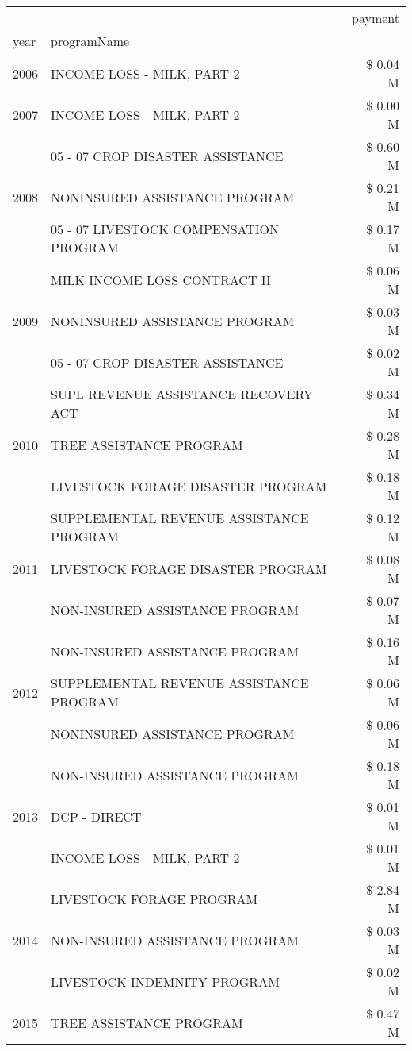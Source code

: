 \begin{tabular}{llr}
\toprule
 &  & payment \\
year & programName &  \\
\midrule
2006 & INCOME LOSS - MILK, PART 2 & \$ 0.04 M \\
\cline{1-3}
2007 & INCOME LOSS - MILK, PART 2 & \$ 0.00 M \\
\cline{1-3}
\multirow[t]{3}{*}{2008} & 05 - 07 CROP DISASTER ASSISTANCE & \$ 0.60 M \\
 & NONINSURED ASSISTANCE PROGRAM & \$ 0.21 M \\
 & 05 - 07 LIVESTOCK COMPENSATION PROGRAM & \$ 0.17 M \\
\cline{1-3}
\multirow[t]{3}{*}{2009} & MILK INCOME LOSS CONTRACT II & \$ 0.06 M \\
 & NONINSURED ASSISTANCE PROGRAM & \$ 0.03 M \\
 & 05 - 07 CROP DISASTER ASSISTANCE & \$ 0.02 M \\
\cline{1-3}
\multirow[t]{3}{*}{2010} & SUPL REVENUE ASSISTANCE RECOVERY ACT & \$ 0.34 M \\
 & TREE ASSISTANCE PROGRAM & \$ 0.28 M \\
 & LIVESTOCK FORAGE DISASTER  PROGRAM & \$ 0.18 M \\
\cline{1-3}
\multirow[t]{3}{*}{2011} & SUPPLEMENTAL REVENUE ASSISTANCE PROGRAM & \$ 0.12 M \\
 & LIVESTOCK FORAGE DISASTER PROGRAM & \$ 0.08 M \\
 & NON-INSURED ASSISTANCE PROGRAM & \$ 0.07 M \\
\cline{1-3}
\multirow[t]{3}{*}{2012} & NON-INSURED ASSISTANCE PROGRAM & \$ 0.16 M \\
 & SUPPLEMENTAL REVENUE ASSISTANCE PROGRAM & \$ 0.06 M \\
 & NONINSURED ASSISTANCE PROGRAM & \$ 0.06 M \\
\cline{1-3}
\multirow[t]{3}{*}{2013} & NON-INSURED ASSISTANCE PROGRAM & \$ 0.18 M \\
 & DCP - DIRECT & \$ 0.01 M \\
 & INCOME LOSS - MILK, PART 2 & \$ 0.01 M \\
\cline{1-3}
\multirow[t]{3}{*}{2014} & LIVESTOCK FORAGE PROGRAM & \$ 2.84 M \\
 & NON-INSURED ASSISTANCE PROGRAM & \$ 0.03 M \\
 & LIVESTOCK INDEMNITY PROGRAM & \$ 0.02 M \\
\cline{1-3}
\multirow[t]{3}{*}{2015} & TREE ASSISTANCE PROGRAM & \$ 0.47 M \\

\end{tabular}
